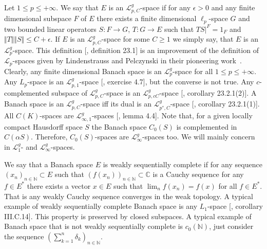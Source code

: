 Let $1\leq p\leq +\infty$. We say that $E$ is an $\mathscr{L}_{p,C}^g$-space if
for any $\epsilon>0$ and any finite dimensional subspace $F$ of $E$ there exists
a finite dimensional $\ell_p$-space $G$ and two bounded linear operators 
$S:F\to G$, $T:G\to E$ such that $TS|^F=1_F$ and 
$\Vert T\Vert\Vert S\Vert\leq C+\epsilon$. 
If $E$ is an $\mathscr{L}_{p,C}^g$-space for some $C\geq 1$ we
simply say, that $E$ is an $\mathscr{L}_p^g$-space. This definition
[\cite{DefFloTensNorOpId}, definition 23.1] is an improvement of the definition
of $\mathscr{L}_p$-spaces given by Lindenstrauss and Pelczynski in their
pioneering work~\cite{LinPelAbsSumOpInLpSpAndApp}. Clearly, any finite
dimensional Banach space is an $\mathscr{L}_p^g$-space for 
all $1\leq p\leq +\infty$. Any $L_p$-space is an $\mathscr{L}_{p,1}^g$-space
[\cite{DefFloTensNorOpId}, exercise 4.7], but the converse is not true. Any
$c$-complemented subspace of $\mathscr{L}_{p,C}^g$-space is an
$\mathscr{L}_{p,cC}^g$-space [\cite{DefFloTensNorOpId}, corollary 23.2.1(2)]. A
Banach space is an $\mathscr{L}_{p,C}^g$-space iff its dual is an
$\mathscr{L}_{p^*,C}^g$-space [\cite{DefFloTensNorOpId}, corollary 23.2.1(1)].
All $C(K)$-spaces are $\mathscr{L}_{\infty, 1}^g$-spaces
[\cite{DefFloTensNorOpId}, lemma 4.4]. Note that, for a given locally compact
Hausdorff space $S$ the Banach space $C_0(S)$ is complemented in $C(\alpha S)$.
Therefore, $C_0(S)$-spaces are $\mathscr{L}_\infty^g$-spaces too. We will mainly
concern in $\mathscr{L}_1^g$- and $\mathscr{L}_\infty^g$-spaces.

We say that a Banach space $E$ is weakly sequentially complete if for any
sequence ${(x_n)}_{n\in\mathbb{N}}\subset E$ such that
${(f(x_n))}_{n\in\mathbb{N}}\subset\mathbb{C}$ is a Cauchy sequence for 
any $f\in E^*$ there exists a vector $x\in E$ 
such that $\lim_n f(x_n)=f(x)$ for all $f\in E^*$. That is any weakly 
Cauchy sequence converges in the weak topology. A typical example of weakly 
sequentially complete Banach space is any $L_1$-space
[\cite{WojBanSpForAnalysts}, corollary III.C.14]. This property is preserved by
closed subspaces. A typical example of Banach space that is not weakly
sequentially complete is $c_0(\mathbb{N})$, just consider the sequence
${(\sum_{k=1}^n \delta_k)}_{n\in\mathbb{N}}$.

